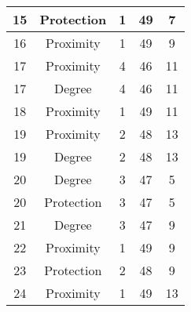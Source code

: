 \documentclass[results.tex]{subfiles}
\begin{document}
\begin{center}
\begin{tabular}{| c || c | c | c | c |}
            \hline
            15                      & Protection                   & 1                      & 49                      & 7                    \\
            \hline
            16                      & Proximity                    & 1                      & 49                      & 9                    \\
            \hline
            17                      & Proximity                    & 4                      & 46                      & 11                   \\
            \hline
            17                      & Degree                       & 4                      & 46                      & 11                   \\
            \hline
            18                      & Proximity                    & 1                      & 49                      & 11                   \\
            \hline
            19                      & Proximity                    & 2                      & 48                      & 13                   \\
            \hline
            19                      & Degree                       & 2                      & 48                      & 13                   \\
            \hline
            20                      & Degree                       & 3                      & 47                      & 5                    \\
            \hline
            20                      & Protection                   & 3                      & 47                      & 5                    \\
            \hline
            21                      & Degree                       & 3                      & 47                      & 9                    \\
            \hline
            22                      & Proximity                    & 1                      & 49                      & 9                    \\
            \hline
            23                      & Protection                   & 2                      & 48                      & 9                    \\
            \hline
            24                      & Proximity                    & 1                      & 49                      & 13                   \\

\end{tabular}
\end{center}
\end{document}
